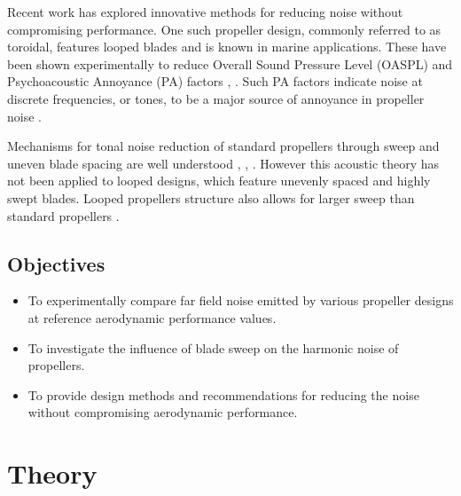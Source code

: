 \documentclass[12pt,a4paper]{article}
\begin{document}
Recent work has explored innovative methods for reducing noise without compromising performance.
One such propeller design, commonly referred to as toroidal, features looped blades and is known in marine applications.
These have been shown experimentally to reduce Overall Sound Pressure Level (OASPL) and Psychoacoustic Annoyance (PA) factors \cite{shima_toroidal}, \cite{ijerph20031955}.
Such PA factors indicate noise at discrete frequencies, or tones, to be a major source of annoyance in propeller noise \cite{ijerph20031955}. %

Mechanisms for tonal noise reduction of standard propellers through sweep and uneven blade spacing are well understood \cite{hanson_influence}, \cite{DOBRZYNSKI1993123}, \cite{doi:10.2514/3.22938}.
However this acoustic theory has not been applied to looped designs, which feature unevenly spaced and highly swept blades.
Looped propellers structure also allows for larger sweep than standard propellers \cite{shima_toroidal}.



\subsection{Objectives}



\begin{itemize}
    \item To experimentally compare far field noise emitted by various propeller designs at reference aerodynamic performance values.
    \item To investigate the influence of blade sweep on the harmonic noise of propellers.
    \item To provide design methods and recommendations for reducing the noise without compromising aerodynamic performance.
\end{itemize}

\section{Theory}
\end{document}
